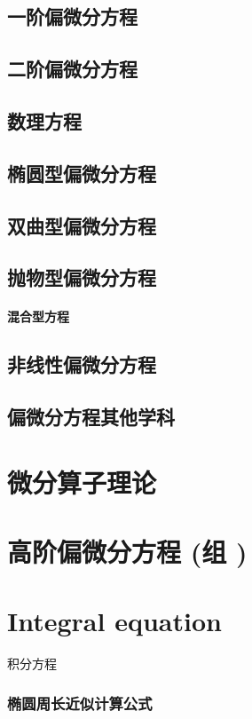 \documentclass[UTF8]{../09-Mathematics}
\begin{document}
\section{一阶偏微分方程}
\section{二阶偏微分方程}
\section{数理方程}
\section{椭圆型偏微分方程}
\section{双曲型偏微分方程}
\section{抛物型偏微分方程}
\subsubsection{混合型方程}
\section{非线性偏微分方程}
\section{偏微分方程其他学科}



\chapter{微分算子理论}
\chapter{高阶偏微分方程 (组 )}





\chapter{Integral equation}

积分方程


\subsection{椭圆周长近似计算公式}
\end{document}
